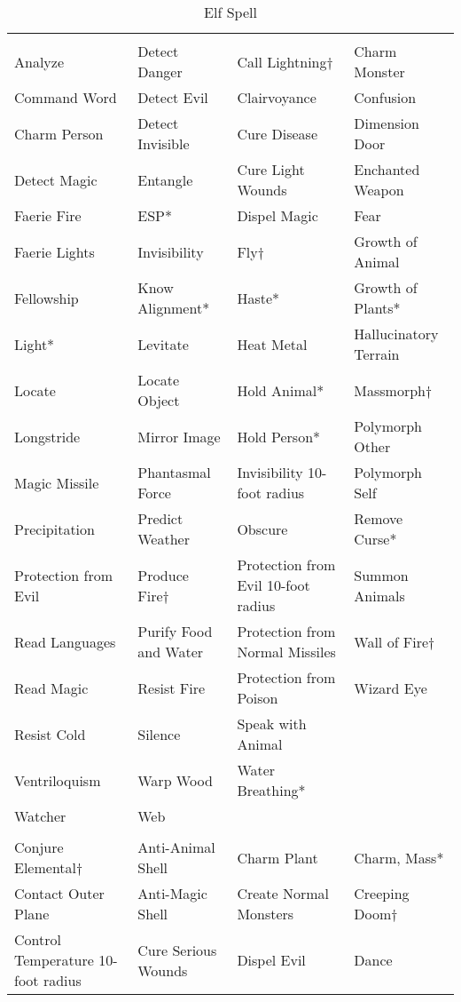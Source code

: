 \begin {table}[H]
  \caption{Elf Spell}
  \begin{tabularx}{\columnwidth}{YYYY}
	 &  &  & \\
	Analyze & Detect Danger & Call Lightning† & Charm Monster\\
	Command Word & Detect Evil & Clairvoyance & Confusion\\
	Charm Person & Detect Invisible & Cure Disease & Dimension Door\\
	Detect Magic & Entangle & Cure Light Wounds & Enchanted Weapon\\
	Faerie Fire & ESP* & Dispel Magic & Fear\\
	Faerie Lights & Invisibility & Fly† & Growth of Animal\\
	Fellowship & Know Alignment* & Haste* & Growth of Plants*\\
	Light* & Levitate & Heat Metal & Hallucinatory Terrain\\
	Locate & Locate Object & Hold Animal* & Massmorph†\\
	Longstride & Mirror Image & Hold Person* & Polymorph Other\\
	Magic Missile & Phantasmal Force & Invisibility 10-foot radius & Polymorph Self\\
	Precipitation & Predict Weather & Obscure & Remove Curse*\\
	Protection from Evil & Produce Fire† & Protection from Evil 10-foot radius & Summon Animals\\
	Read Languages & Purify Food and Water & Protection from Normal Missiles & Wall of Fire†\\
	Read Magic & Resist Fire & Protection from Poison & Wizard Eye\\
	Resist Cold & Silence & Speak with Animal &\\
	Ventriloquism & Warp Wood & Water Breathing* &\\
	Watcher & Web &  &\\
	 &  &  & \\
	Conjure Elemental† & Anti-Animal Shell & Charm Plant & Charm, Mass*\\
	Contact Outer Plane & Anti-Magic Shell & Create Normal Monsters & Creeping Doom†\\
	Control Temperature 10-foot radius & Cure Serious Wounds & Dispel Evil & Dance\\

\end{tabularx}
\end{table}
